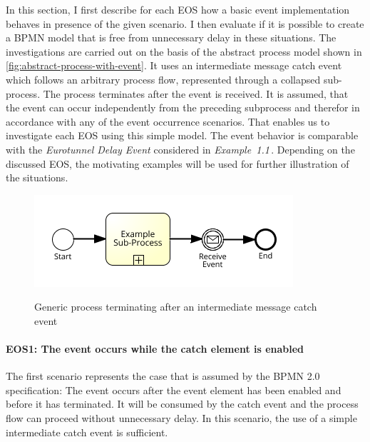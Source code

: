 In this section, I first describe for each \ac{EOS} how a basic event implementation behaves in presence of the given scenario.
I then evaluate if it is possible to create a BPMN model that is free from unnecessary delay in these situations.
The investigations are carried out on the basis of the abstract process model shown in \autoref{fig:abstract-process-with-event}.
It uses an intermediate message catch event which follows an arbitrary process flow, represented through a collapsed sub-process.
The process terminates after the event is received.
It is assumed, that the event can occur independently from the preceding subprocess and therefor in accordance with any of the event occurrence scenarios. That enables us to investigate each EOS using this simple model.
The event behavior is comparable with the \textit{Eurotunnel Delay Event} considered in \textit{Example~1.1}\,. Depending on the discussed EOS, the motivating examples will be used for further illustration of the situations.


\begin{figure}[]
	\myfloatalign
	{\includegraphics[width=0.7\linewidth]{chapters/assessment/generic-process-with-interm-event.png}}
	\caption{Generic process terminating after an intermediate message catch event}\label{fig:abstract-process-with-event}
\end{figure}


\paragraph{EOS1: The event occurs while the catch element is enabled}

The first scenario represents the case that is assumed by the BPMN 2.0 specification: 
The event occurs after the event element has been enabled and before it has terminated. It will be consumed by the catch event and the process flow can proceed without unnecessary delay.
In this scenario, the use of a simple intermediate catch event is sufficient.


